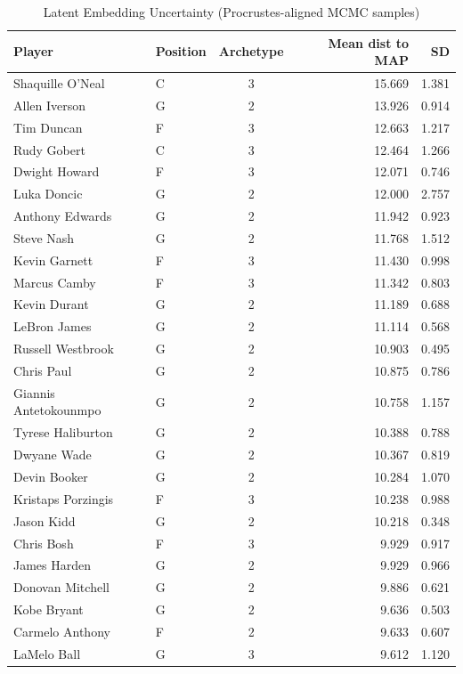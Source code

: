 \begin{table}[t]
\caption*{
{\fontsize{20}{25}\selectfont  Latent Embedding Uncertainty (Procrustes-aligned MCMC samples)\fontsize{12}{15}\selectfont }
} 
\fontsize{12.0pt}{14.0pt}\selectfont
\begin{tabular*}{\linewidth}{@{\extracolsep{\fill}}llcrr}
\toprule
Player & Position & Archetype & Mean dist to MAP & SD \\ 
\midrule\addlinespace[2.5pt]
Shaquille O'Neal & C & 3 & 15.669 & 1.381 \\ 
Allen Iverson & G & 2 & 13.926 & 0.914 \\ 
Tim Duncan & F & 3 & 12.663 & 1.217 \\ 
Rudy Gobert & C & 3 & 12.464 & 1.266 \\ 
Dwight Howard & F & 3 & 12.071 & 0.746 \\ 
Luka Doncic & G & 2 & 12.000 & 2.757 \\ 
Anthony Edwards & G & 2 & 11.942 & 0.923 \\ 
Steve Nash & G & 2 & 11.768 & 1.512 \\ 
Kevin Garnett & F & 3 & 11.430 & 0.998 \\ 
Marcus Camby & F & 3 & 11.342 & 0.803 \\ 
Kevin Durant & G & 2 & 11.189 & 0.688 \\ 
LeBron James & G & 2 & 11.114 & 0.568 \\ 
Russell Westbrook & G & 2 & 10.903 & 0.495 \\ 
Chris Paul & G & 2 & 10.875 & 0.786 \\ 
Giannis Antetokounmpo & G & 2 & 10.758 & 1.157 \\ 
Tyrese Haliburton & G & 2 & 10.388 & 0.788 \\ 
Dwyane Wade & G & 2 & 10.367 & 0.819 \\ 
Devin Booker & G & 2 & 10.284 & 1.070 \\ 
Kristaps Porzingis & F & 3 & 10.238 & 0.988 \\ 
Jason Kidd & G & 2 & 10.218 & 0.348 \\ 
Chris Bosh & F & 3 & 9.929 & 0.917 \\ 
James Harden & G & 2 & 9.929 & 0.966 \\ 
Donovan Mitchell & G & 2 & 9.886 & 0.621 \\ 
Kobe Bryant & G & 2 & 9.636 & 0.503 \\ 
Carmelo Anthony & F & 2 & 9.633 & 0.607 \\ 
LaMelo Ball & G & 3 & 9.612 & 1.120 \\ 

\end{tabular*}
\end{table}
